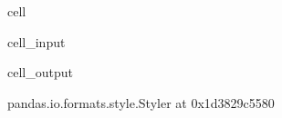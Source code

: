 \documentclass[letterpaper,10pt,english]{jupyterBook}
\begin{document}
\begin{sphinxuseclass}{cell}\begin{sphinxVerbatimInput}

\begin{sphinxuseclass}{cell_input}
\begin{sphinxVerbatim}[commandchars=\\\{\}]
   
\end{sphinxVerbatim}

\end{sphinxuseclass}\end{sphinxVerbatimInput}
\begin{sphinxVerbatimOutput}

\begin{sphinxuseclass}{cell_output}
\begin{sphinxVerbatim}[commandchars=\\\{\}]
\PYGZlt{}pandas.io.formats.style.Styler at 0x1d3829c5580\PYGZgt{}
\end{sphinxVerbatim}

\end{sphinxuseclass}\end{sphinxVerbatimOutput}

\end{sphinxuseclass}
\end{document}

